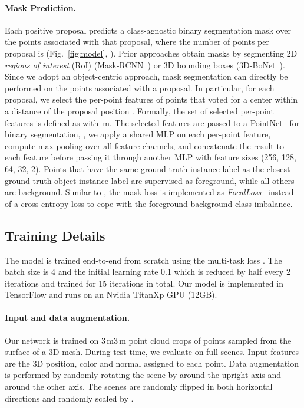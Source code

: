 \documentclass[10pt,twocolumn,letterpaper]{article}
\newcommand{\reffig}[1]{Fig.~\ref{fig:#1}}
\newcommand{\colorsquare}[1]{{\color{#1}}\hspace{-7.78pt}}
\newcommand{\parag}[1]{\vspace{0px}\paragraph{#1}\hspace{-9pt}}
\begin{document}
\vspace{-13px}
\parag{Mask Prediction.}
Each positive proposal predicts a class-agnostic binary segmentation mask over the points  associated with that proposal, where the number of points per proposal  is  (\reffig{model}, \colorsquare{m_blue}).
Prior approaches obtain masks by segmenting 2D \emph{regions of interest} (RoI) (Mask-RCNN~\cite{He17ICCV}) or 3D bounding boxes (3D-BoNet~\cite{Yang19CVPR}). 
Since we adopt an object-centric approach, mask segmentation can directly be performed on the points  associated with a proposal.
In particular, for each proposal, we select the per-point features  of points that voted for a center within a distance  of the proposal position .
Formally, the set of selected per-point features is defined as  with \,m.
The selected features  are passed to a PointNet~\cite{QiCVPR16} for binary segmentation, \ie, we apply a shared MLP on each per-point feature, compute max-pooling over all feature channels, and concatenate the result to each feature before passing it through another MLP with feature sizes (256, 128, 64, 32, 2).
Points that have the same ground truth instance label as the closest ground truth object instance label are supervised as foreground, while all others are background.
Similar to \cite{Yang19CVPR}, the mask loss  is implemented as \emph{FocalLoss}~\cite{Lin17ICCV} instead of a cross-entropy loss to cope with the foreground-background class imbalance.


\subsection{Training Details}
\vspace{-5px}
The model is trained end-to-end from scratch using the multi-task loss
. 
The batch size is 4 and the initial learning rate 0.1 which is reduced by half every 2 iterations and trained for 15 iterations in total.
Our model is implemented in TensorFlow and runs on an Nvidia TitanXp GPU (12GB). 
\vspace{-13px}
\parag{Input and data augmentation.}
Our network is trained on 3\,m3\,m point cloud crops of  points sampled from the surface of a 3D mesh.
During test time, we evaluate on full scenes.
Input features are the 3D position, color and normal assigned to each point. 
Data augmentation is performed by randomly rotating the scene by  around the upright axis and  around the other axis. The scenes are randomly flipped in both horizontal directions and randomly scaled by .
 
\end{document}
